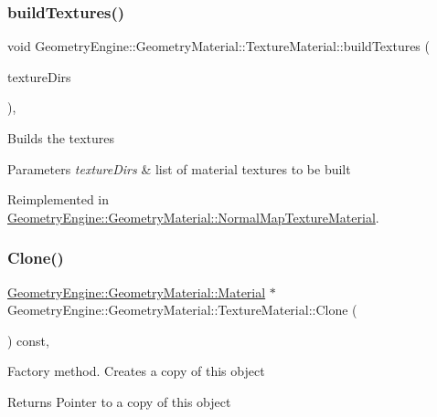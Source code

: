 \subsubsection{\texorpdfstring{buildTextures()}{buildTextures()}}
{\footnotesize\ttfamily void Geometry\+Engine\+::\+Geometry\+Material\+::\+Texture\+Material\+::build\+Textures (\begin{DoxyParamCaption}\item[{const std\+::list$<$ \mbox{\hyperlink{class_geometry_engine_1_1_geometry_material_1_1_texture_parameters}{Texture\+Parameters}} $\ast$ $>$ \&}]{texture\+Dirs }\end{DoxyParamCaption})\hspace{0.3cm}{\ttfamily [protected]}, {\ttfamily [virtual]}}

Builds the textures 
\begin{DoxyParams}{Parameters}
{\em texture\+Dirs} & list of material textures to be built \\
\hline
\end{DoxyParams}


Reimplemented in \mbox{\hyperlink{class_geometry_engine_1_1_geometry_material_1_1_normal_map_texture_material_a42321fbd382c20de406f80d44849c183}{Geometry\+Engine\+::\+Geometry\+Material\+::\+Normal\+Map\+Texture\+Material}}.

\mbox{\label{class_geometry_engine_1_1_geometry_material_1_1_texture_material_ace905cf02deb41ad8aa422ef2fb9070f}} 
\subsubsection{\texorpdfstring{Clone()}{Clone()}}
{\footnotesize\ttfamily \mbox{\hyperlink{class_geometry_engine_1_1_geometry_material_1_1_material}{Geometry\+Engine\+::\+Geometry\+Material\+::\+Material}} $\ast$ Geometry\+Engine\+::\+Geometry\+Material\+::\+Texture\+Material\+::\+Clone (\begin{DoxyParamCaption}{ }\end{DoxyParamCaption}) const\hspace{0.3cm}{\ttfamily [override]}, {\ttfamily [virtual]}}

Factory method. Creates a copy of this object \begin{DoxyReturn}{Returns}
Pointer to a copy of this object 
\end{DoxyReturn}


